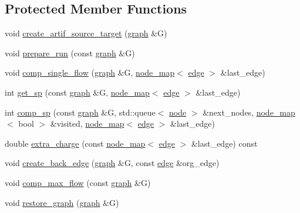 \subsection*{Protected Member Functions}
\begin{DoxyCompactItemize}
\item 
void \mbox{\hyperlink{classmaxflow__ff_ad2634e4325012773d793e9cf8f1a3dcf}{create\+\_\+artif\+\_\+source\+\_\+target}} (\mbox{\hyperlink{classgraph}{graph}} \&G)
\item 
void \mbox{\hyperlink{classmaxflow__ff_a8ad20b45a7d30070bb65e68758c2f7d3}{prepare\+\_\+run}} (const \mbox{\hyperlink{classgraph}{graph}} \&G)
\item 
void \mbox{\hyperlink{classmaxflow__ff_a22a432bb072e0410f20bb418dfd4d3a9}{comp\+\_\+single\+\_\+flow}} (\mbox{\hyperlink{classgraph}{graph}} \&G, \mbox{\hyperlink{classnode__map}{node\+\_\+map}}$<$ \mbox{\hyperlink{classedge}{edge}} $>$ \&last\+\_\+edge)
\item 
int \mbox{\hyperlink{classmaxflow__ff_a532b1285a791d23ab318791bc093fde7}{get\+\_\+sp}} (const \mbox{\hyperlink{classgraph}{graph}} \&G, \mbox{\hyperlink{classnode__map}{node\+\_\+map}}$<$ \mbox{\hyperlink{classedge}{edge}} $>$ \&last\+\_\+edge)
\item 
int \mbox{\hyperlink{classmaxflow__ff_afefc972c43e8eb031abaac1451473f9c}{comp\+\_\+sp}} (const \mbox{\hyperlink{classgraph}{graph}} \&G, std\+::queue$<$ \mbox{\hyperlink{classnode}{node}} $>$ \&next\+\_\+nodes, \mbox{\hyperlink{classnode__map}{node\+\_\+map}}$<$ bool $>$ \&visited, \mbox{\hyperlink{classnode__map}{node\+\_\+map}}$<$ \mbox{\hyperlink{classedge}{edge}} $>$ \&last\+\_\+edge)
\item 
double \mbox{\hyperlink{classmaxflow__ff_a410a7c5b9b75225ec0a48402dc2f6555}{extra\+\_\+charge}} (const \mbox{\hyperlink{classnode__map}{node\+\_\+map}}$<$ \mbox{\hyperlink{classedge}{edge}} $>$ \&last\+\_\+edge) const
\item 
void \mbox{\hyperlink{classmaxflow__ff_aea04831f46fb86990c9ba21fb19d0382}{create\+\_\+back\+\_\+edge}} (\mbox{\hyperlink{classgraph}{graph}} \&G, const \mbox{\hyperlink{classedge}{edge}} \&org\+\_\+edge)
\item 
void \mbox{\hyperlink{classmaxflow__ff_a560d27c4c62b46dcb0a36ac60ebc1efb}{comp\+\_\+max\+\_\+flow}} (const \mbox{\hyperlink{classgraph}{graph}} \&G)
\item 
void \mbox{\hyperlink{classmaxflow__ff_a31a13c79918964a49fa18b4eb514c584}{restore\+\_\+graph}} (\mbox{\hyperlink{classgraph}{graph}} \&G)
\end{DoxyCompactItemize}
